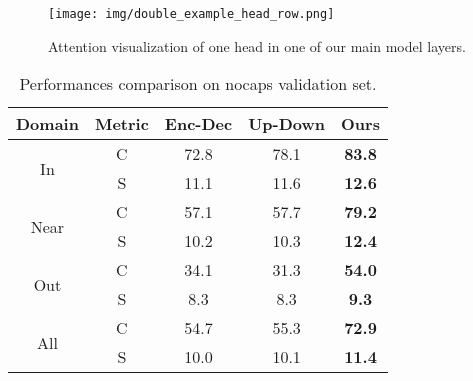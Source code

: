 \begin{figure*}[ht!]
\centering
\texttt{[image: img/double\_example\_head\_row.png]}
\caption{\label{fig:attention_vis.png} Attention visualization of one head in one of our main model layers.}
\end{figure*}

\begin{table}[ht!]
  \caption{Performances comparison on nocaps validation set.}
  \centering
  \footnotesize
  \begin{tabular}{| c c | c c c |} 
 \hline
Domain & Metric & Enc-Dec\cite{changpinyo2021conceptual} & Up-Down\cite{anderson2018bottom} & Ours \\
 \hline
 \multirow{2}{*}{In} & C & 72.8 & 78.1 & \textbf{83.8} \\
  & S & 11.1 & 11.6 & \textbf{12.6} \\
 \hline
 \multirow{2}{*}{Near} & C & 57.1 & 57.7 & \textbf{79.2} \\
 & S & 10.2 & 10.3 & \textbf{12.4} \\
 \hline
 \multirow{2}{*}{Out} & C & 34.1 & 31.3 & \textbf{54.0} \\
 & S & 8.3 & 8.3 & \textbf{9.3} \\
 \hline
 \multirow{2}{*}{All} & C & 54.7 & 55.3 & \textbf{72.9} \\
 & S & 10.0 & 10.1 & \textbf{11.4} \\
 \hline
 \end{tabular}
  \label{tab:no_caps_eval}
\end{table}


